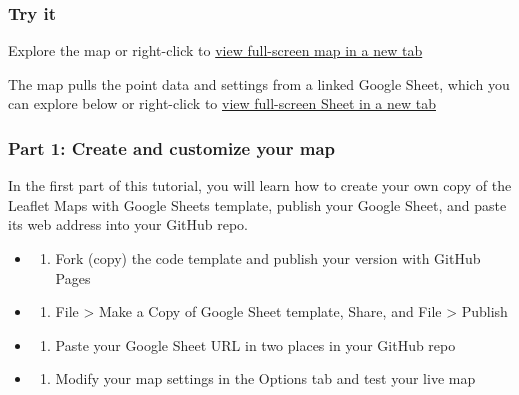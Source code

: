 \documentclass[
  english,
]{book}
\providecommand{\tightlist}{%
  \setlength{\itemsep}{0pt}\setlength{\parskip}{0pt}}
\begin{document}
\hypertarget{try-it-8}{%
\subsubsection*{Try it}\label{try-it-8}}

Explore the map or right-click to \href{https://datavizforall.github.io/leaflet-maps-with-google-sheets/}{view full-screen map in a new tab}

The map pulls the point data and settings from a linked Google Sheet, which you can explore below or right-click to \href{https://docs.google.com/spreadsheets/d/1ZxvU8eGyuN9M8GxTU9acKVJv70iC3px_m3EVFsOHN9g}{view full-screen Sheet in a new tab}

\hypertarget{part-1-create-and-customize-your-map}{%
\subsubsection*{Part 1: Create and customize your map}\label{part-1-create-and-customize-your-map}}

In the first part of this tutorial, you will learn how to create your own copy of the Leaflet Maps with Google Sheets template, publish your Google Sheet, and paste its web address into your GitHub repo.

\begin{itemize}
\item
  \begin{enumerate}
  \def\labelenumi{\Alph{enumi})}
  \tightlist
  \item
    Fork (copy) the code template and publish your version with GitHub Pages
  \end{enumerate}
\item
  \begin{enumerate}
  \def\labelenumi{\Alph{enumi})}
  \setcounter{enumi}{1}
  \tightlist
  \item
    File \textgreater{} Make a Copy of Google Sheet template, Share, and File \textgreater{} Publish
  \end{enumerate}
\item
  \begin{enumerate}
  \def\labelenumi{\Alph{enumi})}
  \setcounter{enumi}{2}
  \tightlist
  \item
    Paste your Google Sheet URL in two places in your GitHub repo
  \end{enumerate}
\item
  \begin{enumerate}
  \def\labelenumi{\Alph{enumi})}
  \setcounter{enumi}{3}
  \tightlist
  \item
    Modify your map settings in the Options tab and test your live map
  \end{enumerate}
\end{itemize}
\end{document}

